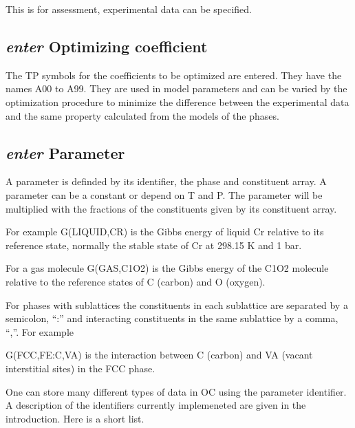 \documentclass[12pt]{article}
\begin{document}
This is for assessment, experimental data can be specified.

\subsection{{\em enter} Optimizing coefficient}

The TP symbols for the coefficients to be optimized are entered.  They
have the names A00 to A99.  They are used in model parameters and can
be varied by the optimization procedure to minimize the difference
between the experimental data and the same property calculated from
the models of the phases.

\subsection{{\em enter} Parameter}

A parameter is definded by its identifier, the phase and constituent
array.  A parameter can be a constant or depend on T and P.  The
parameter will be multiplied with the fractions of the constituents
given by its constituent array.

For example G(LIQUID,CR) is the Gibbs energy of liquid Cr relative to
its reference state, normally the stable state of Cr at 298.15 K and 1
bar.

For a gas molecule G(GAS,C1O2) is the Gibbs energy of the C1O2 molecule
relative to the reference states of C (carbon) and O (oxygen).

For phases with sublattices the constituents in each sublattice are
separated by a semicolon, ``:'' and interacting constituents in
the same sublattice by a comma, ``,''.  For example

G(FCC,FE:C,VA) is the interaction between C (carbon) and VA (vacant
interstitial sites) in the FCC phase.

One can store many different types of data in OC using the parameter
identifier.  A description of the identifiers currently implemeneted
are given in the introduction.  Here is a short list.
\end{document}
